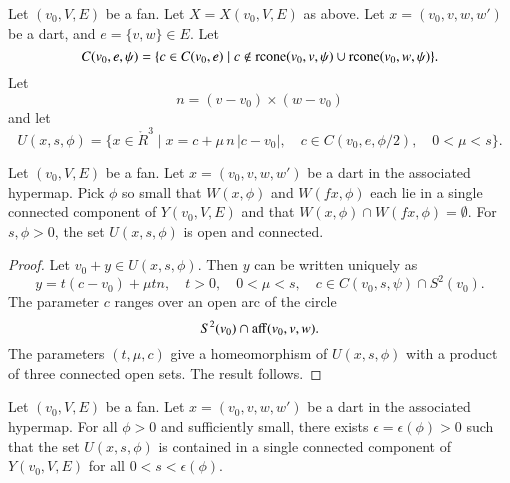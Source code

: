 Let $(v_0,V,E)$ be a fan.  Let $X=X(v_0,V,E)$ as above. Let
$x=(v_0,v,w,w')$ be a dart, and  $e = \{v,w\}\in E$.
Let 
  $$C(v_0,e,\psi) =
    \{ c\in C(v_0,e) \mid c\not\in {\operatorname{rcone}}(v_0,v,\psi)
    \cup{\operatorname{rcone}}(v_0,w,\psi)\}.
  $$
Let 
  $$n = (v-v_0)\times (w-v_0)$$
and let
  $$
  U(x,s,\phi) = \{ x  \in \ring{R}^3 \mid
     x = c + \mu\, n\, |c-v_0|,\quad
     c\in C(v_0,e,\phi/2),\quad
     0 < \mu < s
     \}.
  $$

\begin{lemma}  Let $(v_0,V,E)$ be a fan.
Let $x=(v_0,v,w,w')$ be a dart in the associated hypermap.
Pick $\phi$ so small that $W(x,\phi)$
and $W(f x,\phi)$ each lie in a single connected component 
of $Y(v_0,V,E)$ and
that $W(x,\phi)\cap W(f x,\phi) =\emptyset$.
For $s,\phi > 0$, the set $U(x,s,\phi)$ is
open and connected.
\end{lemma}

\begin{proof}  Let $v_0 + y \in U(x,s,\phi)$.
Then $y$ can be written uniquely as
$$
  y = t (c - v_0) + \mu t n,\quad
  t > 0,\quad
  0 < \mu < s,\quad
  c \in C(v_0,s,\psi) \cap S^2(v_0).
$$
The parameter $c$ ranges over an open arc of the circle
$$S^2(v_0) \cap {\operatorname{aff}}(v_0,v,w).$$
The parameters $(t,\mu,c)$ give a homeomorphism of $U(x,s,\phi)$
with a product of three connected open sets.  The result follows.
\end{proof}



\begin{lemma}
Let $(v_0,V,E)$ be a fan.
Let $x=(v_0,v,w,w')$ be a dart in the associated hypermap.
For all $\phi > 0$ and sufficiently small, there exists
$\epsilon=\epsilon(\phi)>0$ such that
the set $U(x,s,\phi)$ is
contained in a single connected component of $Y(v_0,V,E)$ for all 
$0 < s <\epsilon(\phi)$.
\end{lemma}

